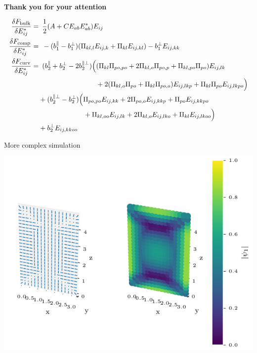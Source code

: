 \documentclass[10pt,mathserif]{beamer}
\begin{document}
\begin{frame}[fragile]
    \newrefsection
    \vspace{4em}
    \begin{center}
        \LARGE
        \textbf{Thank you for your attention}
    \end{center}
    \vspace{2em}
    \footnotesize
    \color{gray}
    \begin{align*}
        \fdv{F_\text{bulk}}{E_{ij}^*} =&\enspace \frac{1}{2}\qty(A + C E_{ab}E_{ab}^*)E_{ij} \\
        \fdv{F_\text{comp}}{E_{ij}^*} =&\enspace -(b_1^\parallel - b_1^\perp) (\Pi_{kl,l} E_{ij,k} + \Pi_{kl} E_{ij,kl}) - b_1^\perp E_{ij,kk} \\
        \fdv{F_\text{curv}}{E_{ij}^*} =&\enspace (b_2^\parallel + b_2^\perp - 2b_2^{\parallel\perp}) \Bigl( (\Pi_{kl}\Pi_{po,po} + 2\Pi_{kl,o}\Pi_{po,p} + \Pi_{kl,po}\Pi_{po})E_{ij,lk} \\
        &\phantom{\enspace (b_2^\parallel + b_2^\perp - 2b_2^{\parallel\perp}) \Bigl(}+ 2(\Pi_{kl,o}\Pi_{po} + \Pi_{kl}\Pi_{po,o})E_{ij,lkp} + \Pi_{kl}\Pi_{po}E_{ij,lkpo} \Bigr) \nonumber \\
        &+ (b_2^{\parallel\perp} - b_2^\perp)\Bigl( \Pi_{po,po}E_{ij,kk} + 2\Pi_{po,o}E_{ij,kkp} + \Pi_{po}E_{ij,kkpo} \nonumber \\ 
        &\phantom{\enspace+ (b_2^{\parallel\perp} - b_2^\perp)\Bigl(}+ \Pi_{kl,oo}E_{ij,lk} + 2\Pi_{kl,o}E_{ij,lko} + \Pi_{kl}E_{ij,lkoo} \Bigr) \nonumber \\ 
        &+ b_2^\perp E_{ij,kkoo} \nonumber
    \end{align*}
    \normalcolor\normalsize
\end{frame}

\begin{frame}[fragile]{More complex simulation}
    \newrefsection
    \begin{center}
        \includegraphics{figures/data_plots/3dfbox_r17_side.pdf}
    \end{center}
\end{frame}
\end{document}
